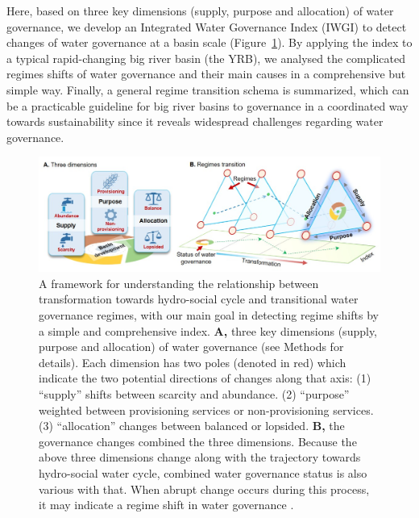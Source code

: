 \documentclass[9pt, twocolumn, twoside, lineno]{pnas-new}
\begin{document}
\label{introduction-section-3}
Here, based on three key dimensions (supply, purpose and allocation) of water governance, we develop an Integrated Water Governance Index (IWGI) to detect changes of water governance at a basin scale (Figure~\ref{fig:framework}).
By applying the index to a typical rapid-changing big river basin (the YRB), we analysed the complicated regimes shifts of water governance and their main causes in a comprehensive but simple way.
Finally, a general regime transition schema is summarized, which can be a practicable guideline for big river basins to governance in a coordinated way towards sustainability since it reveals widespread challenges regarding water governance.


\begin{figure}%
	\centering
	\includegraphics[width=0.8\linewidth]{../../figures/main/framework.jpg}
	\caption{
		A framework for understanding the relationship between transformation towards hydro-social cycle and transitional water governance regimes, with our main goal in detecting regime shifts by a simple and comprehensive index.
		\textbf{A,} three key dimensions (supply, purpose and allocation) of water governance (see Methods for details). Each dimension has two poles (denoted in red) which indicate the two potential directions of changes along that axis: (1) ``supply'' shifts between scarcity and abundance. (2) ``purpose'' weighted between provisioning services or non-provisioning services. (3) ``allocation'' changes between balanced or lopsided. 
		\textbf{B,} the governance changes combined the three dimensions. Because the above three dimensions change along with the trajectory towards hydro-social water cycle, combined water governance status is also various with that. When abrupt change occurs during this process, it may indicate a regime shift in water governance
		\cite{steffen2018,abbott2019,levia2020}.
	}
	\label{fig:framework}
\end{figure}
\end{document}
